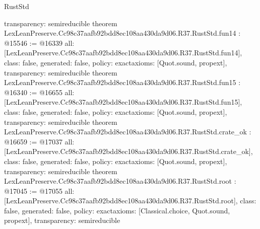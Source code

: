 \begin{lexlean}{RustStd}
\begin{coremodule}
{  transparency: semireducible
}
theorem LexLeanPreserve.Cc98c37aafb92bdd8ec108aa430da9d06.R37.RustStd.fun14 : @15546 := @16339 {
  all: [LexLeanPreserve.Cc98c37aafb92bdd8ec108aa430da9d06.R37.RustStd.fun14],
  class: false,
  generated: false,
  policy: exact{axioms: [Quot.sound, propext]},
  transparency: semireducible
}
theorem LexLeanPreserve.Cc98c37aafb92bdd8ec108aa430da9d06.R37.RustStd.fun15 : @16340 := @16655 {
  all: [LexLeanPreserve.Cc98c37aafb92bdd8ec108aa430da9d06.R37.RustStd.fun15],
  class: false,
  generated: false,
  policy: exact{axioms: [Quot.sound, propext]},
  transparency: semireducible
}
theorem LexLeanPreserve.Cc98c37aafb92bdd8ec108aa430da9d06.R37.RustStd.crate_ok : @16659 := @17037 {
  all: [LexLeanPreserve.Cc98c37aafb92bdd8ec108aa430da9d06.R37.RustStd.crate_ok],
  class: false,
  generated: false,
  policy: exact{axioms: [Quot.sound, propext]},
  transparency: semireducible
}
theorem LexLeanPreserve.Cc98c37aafb92bdd8ec108aa430da9d06.R37.RustStd.root : @17045 := @17055 {
  all: [LexLeanPreserve.Cc98c37aafb92bdd8ec108aa430da9d06.R37.RustStd.root],
  class: false,
  generated: false,
  policy: exact{axioms: [Classical.choice, Quot.sound, propext]},
  transparency: semireducible
}


\end{coremodule}
\end{lexlean}
